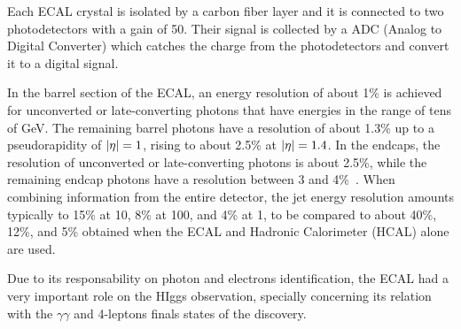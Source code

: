 Each ECAL crystal is isolated by a carbon fiber layer and it is connected to two photodetectors with a gain of 50. Their signal is collected by a ADC (Analog to Digital Converter) which catches the charge from the photodetectors and convert it to a digital signal.

In the barrel section of the ECAL, an energy resolution of about 1\% is achieved for unconverted or late-converting photons that have energies in the range of tens of GeV. The remaining barrel photons have a resolution of about 1.3\% up to a pseudorapidity of $\lvert \eta \rvert = 1$, rising to about 2.5\% at $\lvert \eta \rvert = 1.4$. In the endcaps, the resolution of unconverted or late-converting photons is about 2.5\%, while the remaining endcap photons have a resolution between 3 and 4\%~\cite{CMS:EGM-14-001}. When combining information from the entire detector, the jet energy resolution amounts typically to 15\% at 10\GeV, 8\% at 100\GeV, and 4\% at 1\TeV, to be compared to about 40\%, 12\%, and 5\% obtained when the ECAL and Hadronic Calorimeter (HCAL) alone are used. 

Due to its responsability on photon and electrons identification, the ECAL had a very important role on the HIggs observation, specially concerning its relation with the $\gamma\gamma$ and 4-leptons finals states of the discovery.



